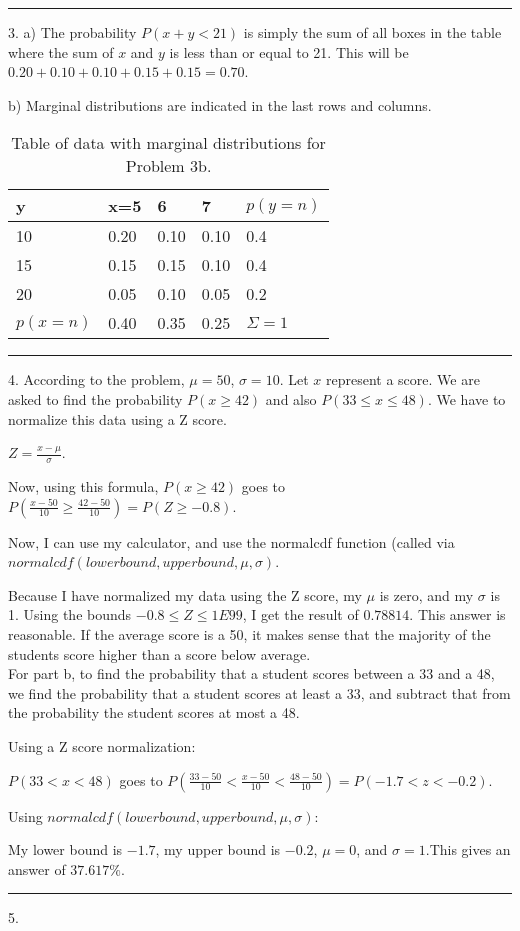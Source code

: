 \documentclass{article}
\begin{document}
\noindent\rule{8cm}{0.4pt}

3. a) The probability  $P(x+y < 21)$ is simply the sum of all boxes in the table where the sum of $x$ and $y$ is less than or equal to 21. This will be $0.20 + 0.10 + 0.10 + 0.15 + 0.15 = \boxed{0.70}$. 

b) Marginal distributions are indicated in the last rows and columns. 
\begin{table}[H]
	\begin{tabular}{|l|l|l|l|l|}
		\hline
		y & x=5 & 6 & 7 & $p(y=n)$ \\ \hline
		10 & 0.20 & 0.10 & 0.10 & 0.4 \\ \hline
		15 & 0.15 & 0.15 & 0.10 & 0.4 \\ \hline
		20 & 0.05 & 0.10 & 0.05 & 0.2 \\ \hline
		$p(x=n)$ & 0.40 & 0.35 & 0.25 & $\Sigma = 1$ \\ \hline
	\end{tabular}
	\caption{Table of data with marginal distributions for Problem 3b. }
\end{table}

\noindent\rule{8cm}{0.4pt}

4. According to the problem, $\mu = 50$, $\sigma = 10$. Let $x$ represent a score. We are asked to find the probability $P(x \geq 42)$ and also $P(33\leq x \leq 48)$. We have to normalize this data using a Z score. 


$Z = \frac{x-\mu}{\sigma}$.

Now, using this formula, $P(x \geq 42)$ goes to $P(\frac{x-50}{10} \geq \frac{42 - 50}{10} )=P(Z \geq -0.8)$. 

Now, I can use my calculator, and use the normalcdf function (called via $normalcdf(lowerbound,upperbound,\mu,\sigma)$. 

Because I have normalized my data using the Z score, my $\mu$ is zero, and my $\sigma$ is 1. Using the bounds $-0.8 \leq Z \leq 1E99$, I get the result of $\boxed{0.78814} $. This answer is reasonable. If the average score is a 50, it makes sense that the majority of the students score higher than a score below average. 
\\

For part b, to find the probability that a student scores between a 33 and a 48, we find the probability that a student scores at least a 33, and subtract that from the probability the student scores at most a 48. 

Using a Z score normalization: 

$P(33 < x < 48)$ goes to $P(\frac{33-50}{10} < \frac{x-50}{10} < \frac{48-50}{10})=P(-1.7 < z < -0.2)$. 

Using $normalcdf(lowerbound,upperbound,\mu,\sigma)$: 

My lower bound is $-1.7$, my upper bound is $-0.2$, $\mu = 0$, and $\sigma=1$.This gives an answer of $\boxed{37.617\%}$. 


\noindent\rule{8cm}{0.4pt}

5. 


 
\end{document}
